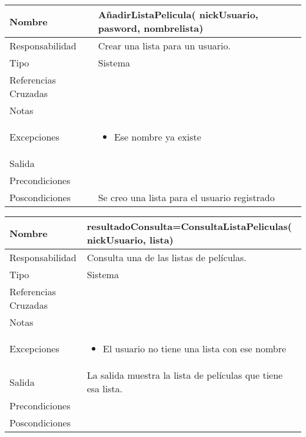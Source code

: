\documentclass{article}
\begin{document}
\begin{table}[h]
\begin{tabular}{|l|l|l|l|l|l|}
\hline
\multicolumn{2}{|p{3cm}|}{Nombre} & \multicolumn{4}{p{10cm}|}{\textbf{AñadirListaPelicula( nickUsuario, pasword,  nombrelista)}}\\
\hline
\multicolumn{2}{|p{3cm}|}{Responsabilidad} & \multicolumn{4}{p{10cm}|}{Crear una lista para un usuario.} \\
\hline
\multicolumn{2}{|p{3cm}|}{Tipo} & \multicolumn{4}{p{10cm}|}{Sistema} \\
\hline
\multicolumn{2}{|p{3cm}|}{Referencias Cruzadas} & \multicolumn{4}{p{10cm}|}{} \\
\hline
\multicolumn{2}{|p{3cm}|}{Notas} & \multicolumn{4}{p{10cm}|}{} \\
\hline
\multicolumn{2}{|p{3cm}|}{Excepciones} & \multicolumn{4}{p{10cm}|}{\begin{itemize}
\item Ese nombre ya existe
\end{itemize}} \\
\hline
\multicolumn{2}{|p{3cm}|}{Salida} & \multicolumn{4}{p{10cm}|}{} \\
\hline
\multicolumn{2}{|p{3cm}|}{Precondiciones} & \multicolumn{4}{p{10cm}|}{} \\
\hline
\multicolumn{2}{|p{3cm}|}{Poscondiciones} & \multicolumn{4}{p{10cm}|}{Se creo una lista para el usuario registrado} \\
\hline
\end{tabular}
\end{table}


\begin{table}[h]
\begin{tabular}{|l|l|l|l|l|l|}
\hline
\multicolumn{2}{|p{3cm}|}{Nombre} & \multicolumn{4}{p{10cm}|}{\textbf{resultadoConsulta=ConsultaListaPeliculas( nickUsuario, lista)}}\\
\hline
\multicolumn{2}{|p{3cm}|}{Responsabilidad} & \multicolumn{4}{p{10cm}|}{Consulta una de las listas de películas.} \\
\hline
\multicolumn{2}{|p{3cm}|}{Tipo} & \multicolumn{4}{p{10cm}|}{Sistema} \\
\hline
\multicolumn{2}{|p{3cm}|}{Referencias Cruzadas} & \multicolumn{4}{p{10cm}|}{} \\
\hline
\multicolumn{2}{|p{3cm}|}{Notas} & \multicolumn{4}{p{10cm}|}{} \\
\hline
\multicolumn{2}{|p{3cm}|}{Excepciones} & \multicolumn{4}{p{10cm}|}{\begin{itemize}
\item El usuario no tiene una lista con ese nombre
\end{itemize}} \\
\hline
\multicolumn{2}{|p{3cm}|}{Salida} & \multicolumn{4}{p{10cm}|}{La salida muestra la lista de películas que tiene esa lista.} \\
\hline
\multicolumn{2}{|p{3cm}|}{Precondiciones} & \multicolumn{4}{p{10cm}|}{} \\
\hline
\multicolumn{2}{|p{3cm}|}{Poscondiciones} & \multicolumn{4}{p{10cm}|}{} \\
\hline
\end{tabular}
\end{table}
\end{document}
